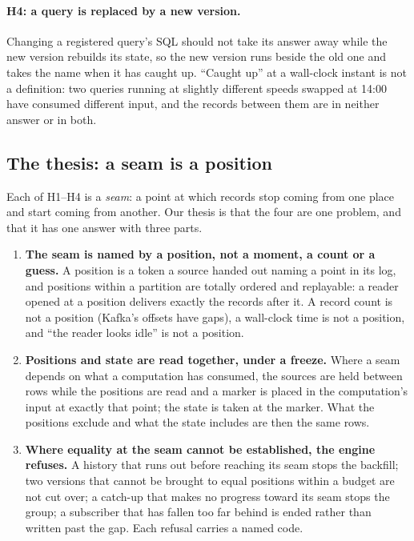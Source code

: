 \documentclass[11pt,a4paper]{article}
\renewcommand{\_}{\oldunderscore\allowbreak}
\newcommand{\defn}[1]{\emph{#1}}
\begin{document}
\paragraph{H4: a query is replaced by a new version.} Changing a registered query's SQL should not
take its answer away while the new version rebuilds its state, so the new version runs beside the old
one and takes the name when it has caught up. ``Caught up'' at a wall-clock instant is not a
definition: two queries running at slightly different speeds swapped at 14:00 have consumed
different input, and the records between them are in neither answer or in both.

\subsection{The thesis: a seam is a position}

Each of H1--H4 is a \defn{seam}: a point at which records stop coming from one place and start
coming from another. Our thesis is that the four are one problem, and that it has one answer with
three parts.

\begin{enumerate}[leftmargin=*,itemsep=3pt]
\item \textbf{The seam is named by a position, not a moment, a count or a guess.} A position is a
      token a source handed out naming a point in its log, and positions within a partition are
      totally ordered and replayable: a reader opened at a position delivers exactly the records after
      it. A record count is not a position (Kafka's offsets have gaps), a wall-clock time is not a
      position, and ``the reader looks idle'' is not a position.
\item \textbf{Positions and state are read together, under a freeze.} Where a seam depends on what
      a computation has consumed, the sources are held between rows while the positions are read and
      a marker is placed in the computation's input at exactly that point; the state is taken at the
      marker. What the positions exclude and what the state includes are then the same rows.
\item \textbf{Where equality at the seam cannot be established, the engine refuses.} A history
      that runs out before reaching its seam stops the backfill; two versions that cannot be brought
      to equal positions within a budget are not cut over; a catch-up that makes no progress toward
      its seam stops the group; a subscriber that has fallen too far behind is ended rather than
      written past the gap. Each refusal carries a named code.
\end{enumerate}
\end{document}
